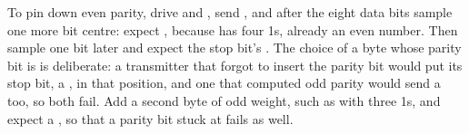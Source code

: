 To pin down even parity, drive  and , send ,
and after the eight data bits sample one more bit centre: expect , because 
has four 1s, already an even number. Then sample one bit later and expect the stop bit's
. The choice of a byte whose parity bit is  is deliberate: a transmitter that
forgot to insert the parity bit would put its stop bit, a , in that position, and one that
computed odd parity would send a  too, so both fail. Add a second byte of odd weight, such
as  with three 1s, and expect a , so that a parity bit stuck at 
fails as well.
